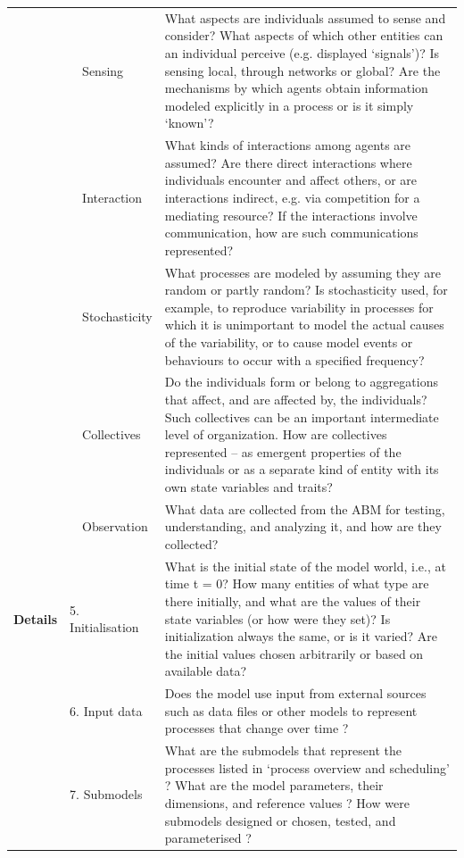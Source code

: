 \begin{table}[H]
{\begin{tabular}{|p{1.1cm}|p{1.15cm}|p{1.25cm}|p{9.5cm}|}
		&  & Sensing & What aspects are individuals assumed to sense and consider? What aspects of which other entities can an individual perceive (e.g. displayed ‘signals’)? Is sensing local, through networks or global? Are the mechanisms by which agents obtain information modeled explicitly in a process or is it simply ‘known’? \\ \cline{3-4} 
		&  & Interaction & What kinds of interactions among agents are assumed? Are there direct interactions where individuals encounter and affect others, or are interactions indirect, e.g. via competition for a mediating resource? If the interactions involve communication, how are such communications represented? \\ \cline{3-4} 
		&  & Stochasticity & What processes are modeled by assuming they are random or partly random? Is stochasticity used, for example, to reproduce variability in processes for which it is unimportant to model the actual causes of the variability, or to cause model events or behaviours to occur with a specified frequency? \\ \cline{3-4} 
		&  & Collectives & Do the individuals form or belong to aggregations that affect, and are affected by, the individuals? Such collectives can be an important intermediate level of organization. How are collectives represented – as emergent properties of the individuals or as a separate kind of entity with its own state variables and traits? \\ \cline{3-4} 
		&  & Observation & What data are collected from the ABM for testing, understanding, and analyzing it, and how are they collected? \\ \hline
		\textbf{Details} & \multicolumn{2}{l|}{5. Initialisation} & What is the initial state of the model world, i.e., at time t = 0? How many entities of what type are there initially, and what are the values of their state variables (or how were they set)? Is initialization always the same, or is it varied? Are the initial values chosen arbitrarily or based on available data? \\ \hline
		& \multicolumn{2}{l|}{6. Input data} & Does the model use input from external sources such as data files or other models to represent processes that change over time ? \\ \cline{2-4} 
		& \multicolumn{2}{l|}{7. Submodels} & What are the submodels that represent the processes listed in ‘process overview and scheduling’ ? What are the model parameters, their dimensions, and reference values ? How were submodels designed or chosen, tested, and parameterised ? \\ \hline
	\end{tabular}}
\end{table}

